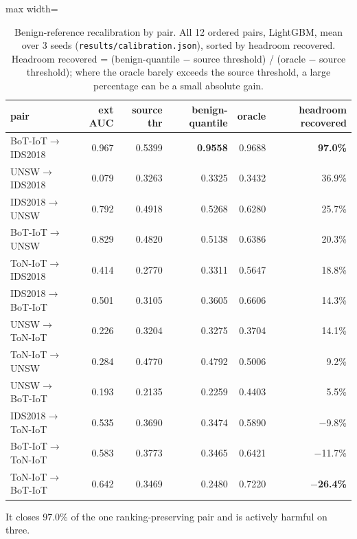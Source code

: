 \documentclass[preprint,12pt,nopreprintline]{elsarticle}
\begin{document}
\begin{table}[htbp]\centering\scriptsize
\caption{Benign-reference recalibration by pair. All 12 ordered pairs, LightGBM, mean over 3 seeds (\texttt{results/calibration.json}), sorted by headroom recovered. Headroom recovered = (benign-quantile $-$ source threshold) / (oracle $-$ source threshold); where the oracle barely exceeds the source threshold, a large percentage can be a small absolute gain.}
\begin{adjustbox}{max width=\textwidth}\begin{tabular}{lrrrrr}
\toprule
pair & ext AUC & source thr & benign-quantile & oracle & headroom recovered \\
\midrule
BoT-IoT$\rightarrow$IDS2018 & 0.967 & 0.5399 & \textbf{0.9558} & 0.9688 & \textbf{97.0\%} \\
UNSW$\rightarrow$IDS2018 & 0.079 & 0.3263 & 0.3325 & 0.3432 & 36.9\% \\
IDS2018$\rightarrow$UNSW & 0.792 & 0.4918 & 0.5268 & 0.6280 & 25.7\% \\
BoT-IoT$\rightarrow$UNSW & 0.829 & 0.4820 & 0.5138 & 0.6386 & 20.3\% \\
ToN-IoT$\rightarrow$IDS2018 & 0.414 & 0.2770 & 0.3311 & 0.5647 & 18.8\% \\
IDS2018$\rightarrow$BoT-IoT & 0.501 & 0.3105 & 0.3605 & 0.6606 & 14.3\% \\
UNSW$\rightarrow$ToN-IoT & 0.226 & 0.3204 & 0.3275 & 0.3704 & 14.1\% \\
ToN-IoT$\rightarrow$UNSW & 0.284 & 0.4770 & 0.4792 & 0.5006 & 9.2\% \\
UNSW$\rightarrow$BoT-IoT & 0.193 & 0.2135 & 0.2259 & 0.4403 & 5.5\% \\
IDS2018$\rightarrow$ToN-IoT & 0.535 & 0.3690 & 0.3474 & 0.5890 & $-$9.8\% \\
BoT-IoT$\rightarrow$ToN-IoT & 0.583 & 0.3773 & 0.3465 & 0.6421 & $-$11.7\% \\
ToN-IoT$\rightarrow$BoT-IoT & 0.642 & 0.3469 & 0.2480 & 0.7220 & \textbf{$-$26.4\%} \\
\bottomrule
\end{tabular}\end{adjustbox}
\end{table}

It closes 97.0\% of the one ranking-preserving pair and is actively harmful on three.
\end{document}
